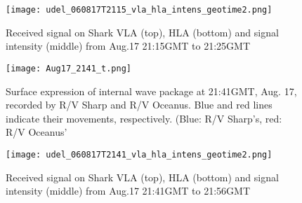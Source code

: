 
\begin{figure}[H]
  \centering
  \texttt{[image: udel\_060817T2115\_vla\_hla\_intens\_geotime2.png]}
  \caption{Received signal on Shark VLA (top), HLA (bottom) and signal intensity (middle) from Aug.17 21:15GMT to 21:25GMT }\label{fig:a2130}
\end{figure}



\begin{figure}[H]
  \centering
  \texttt{[image: Aug17\_2141\_t.png]}
  \caption{Surface expression of internal wave package at 21:41GMT, Aug. 17, recorded by R/V Sharp and R/V Oceanus. Blue and red lines indicate their movements, respectively. (Blue: R/V Sharp's, red: R/V Oceanus'}\label{fig:r2130_r}
\end{figure}


\begin{figure}[H]
  \centering
  \texttt{[image: udel\_060817T2141\_vla\_hla\_intens\_geotime2.png]}
  \caption{Received signal on Shark VLA (top), HLA (bottom) and signal intensity (middle) from Aug.17 21:41GMT to 21:56GMT }\label{fig:a2130}
\end{figure}



